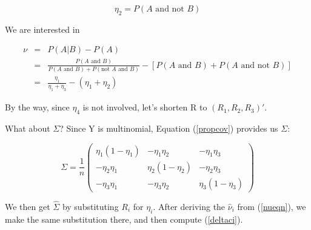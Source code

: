 \begin{equation}
\eta_2 = P(A\textrm{ and not }B)
\end{equation}

We are interested in

\begin{eqnarray}
\label{nueqn}
\nu &=& P(A|B) - P(A) \\
&=& \frac{P(A \textrm{ and } B)}
{P(A \textrm{ and }B) + P(\textrm{not }A \textrm{ and }B)} 
- \left [ P(A \textrm{ and } B) + P(A \textrm{ and not } B) \right ] \\
&=& \frac{\eta_1}{\eta_1+\eta_3} - (\eta_1+\eta_2)
\end{eqnarray}

By the way, since $\eta_4$ is not involved, let's shorten R to
$(R_1,R_2,R_3)'$.

What about $\Sigma$?  Since Y is multinomial, Equation (\ref{propcov})
provides us $\Sigma$:

\begin{equation}
\Sigma = 
\frac{1}{n}
\left (
\begin{array}{rrr}
\eta_1 (1-\eta_1) & -\eta_1 \eta_2 & -\eta_1 \eta_3 \\
-\eta_2 \eta_1 & \eta_2 (1-\eta_2) & -\eta_2 \eta_3 \\
-\eta_3 \eta_1 & -\eta_3 \eta_2 & \eta_3 (1-\eta_3) 
\end{array}
\right )
\end{equation}

We then get $\widehat{\Sigma}$ by substituting $R_i$ for $\eta_i$.
After deriving the $\widehat{\nu}_i$ from (\ref{nueqn}), we make the
same substitution there, and then compute (\ref{deltaci}).

% 
% 
% 

